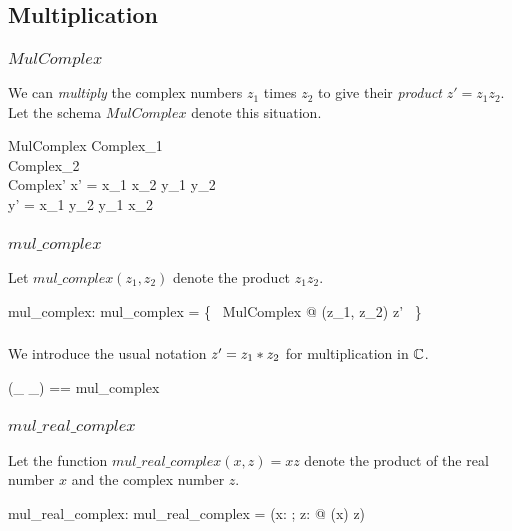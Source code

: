 \documentclass[11pt, oneside]{article}
\begin{document}
\subsection{Multiplication}

\subsubsection{$MulComplex$}

We can \textit{multiply} the complex numbers $z_1$ times $z_2$ to give their \textit{product} $z' = z_1 z_2$.
Let the schema $MulComplex$ denote this situation.

\begin{schema}{MulComplex}
	Complex_1 \\
	Complex_2 \\
	Complex'
\where
	x' = x_1 \mulR x_2 \subR y_1 \mulR y_2 \\
	y' = x_1 \mulR y_2 \addR y_1 \mulR x_2
\end{schema}

\subsubsection{$mul\_complex$}

Let $mul\_complex(z_1, z_2)$ denote the product $z_1 z_2$.

\begin{axdef}
	mul\_complex: \C \cross \C \fun \C
\where
	mul\_complex = \{~ MulComplex @ (z_1, z_2) \mapsto z' ~\}
\end{axdef}

\subsubsection{}

We introduce the usual notation $z' = z_1 \mathbin{*} z_2$ for multiplication in $\mathbb{C}$.

\begin{zed}
	(\_ \mulC \_) == mul\_complex
\end{zed}

\subsubsection{$mul\_real\_complex$}

Let the function $mul\_real\_complex(x, z) = xz$ denote the product of the real number $x$ and
the complex number $z$.

\begin{axdef}
	mul\_real\_complex: \R \cross \C \fun \C
\where
	mul\_real\_complex = (\lambda x: \R; z: \C @ (\asRC x) \mulC z)
\end{axdef}
\end{document}
